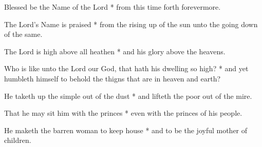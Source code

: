 \begin{multicols}{2}
	Blessed be the Name of the Lord * from this time forth forevermore.
	
	The Lord's Name is praised * from the rising up of the sun unto the going down of the same.
	
	The Lord is high above all heathen * and his glory above the heavens.
	
	Who is like unto the Lord our God, that hath his dwelling so high? * and yet humbleth himself to behold the thigns that are in heaven and earth?
	
	He taketh up the simple out of the dust * and lifteth the poor out of the mire.
	
	That he may sit him with the princes * even with the princes of his people.
	
	He maketh the barren woman to keep house * and to be the joyful mother of children.
\end{multicols}
